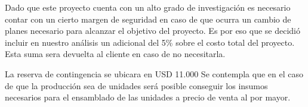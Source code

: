 Dado que este proyecto cuenta con un alto grado de investigación es necesario contar con un cierto margen de seguridad en caso de que ocurra un cambio de planes necesario para alcanzar el objetivo del proyecto. Es por eso que se decidió incluir en nuestro análisis un adicional del 5\% sobre el costo total del proyecto. Esta suma sera devuelta al cliente en caso de no necesitarla.

La reserva de contingencia se ubicara en  USD 11.000
Se contempla que en el caso de que la producción sea de \unidadespostfin unidades será posible conseguir los insumos necesarios para el ensamblado de las unidades a precio de venta al por mayor.
